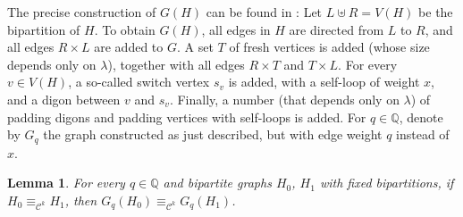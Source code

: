 \documentclass[11pt, DIV=15]{scrarticle}
\theoremstyle{definition}
\theoremstyle{plain}
\newtheorem{lemma}[definition]{Lemma}
\theoremstyle{remark}
\newcommand{\bbQ}{\mathbb{Q}}
\begin{document}
The precise construction of $G(H)$ can be found in  \cite[Lemma 20]{curticapean2021complexitydichotomyimmanantfamilies}:
Let $L \uplus R = V(H)$ be the bipartition of $H$. To obtain $G(H)$, all edges in $H$ are directed from $L$ to $R$, and all edges $ R \times L$ are added to $G$. A set $T$ of fresh vertices is added (whose size depends only on $\lambda$), together with all edges $R \times T$ and $T \times L$. For every $v \in V(H)$, a so-called switch vertex $s_v$ is added, with a self-loop of weight $x$, and a digon between $v$ and $s_v$. Finally, a number (that depends only on $\lambda$) of padding digons and padding vertices with self-loops is added. 
For $q \in \bbQ$, denote by $G_q$ the graph constructed as just described, but with edge weight $q$ instead of $x$.
\begin{lemma}
	\label{lem:raduReductionPreservesCkEquivalence}
	For every $q \in \bbQ$ and bipartite graphs $H_0$, $H_1$ with fixed bipartitions,
	if $H_0 \equiv_{\mathcal{C}^k} H_1$, then $G_q(H_0) \equiv_{\mathcal{C}^{k}} G_q(H_1)$.
\end{lemma}	
\end{document}
